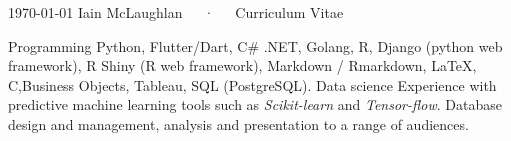 \documentclass[11pt, a4paper]{awesome-cv}
\begin{document}
\makecvheader
\makecvfooter
  {\today}
  {Iain McLaughlan~~~·~~~Curriculum Vitae}
  {\thepage}
  




\begin{cvskills}
  \cvskill
    {Programming} %
    {Python, Flutter/Dart, C# .NET, Golang, R, Django (python web framework), R Shiny (R web framework), Markdown / Rmarkdown, LaTeX, C,\newline Business Objects, Tableau, SQL (PostgreSQL).} %
  \cvskill
    {Data science}
    {Experience with predictive machine learning tools such as \textit{Scikit-learn} and \textit{Tensor-flow}. Database design and management, analysis and presentation to a range of audiences.}

\end{cvskills}




\end{document}
